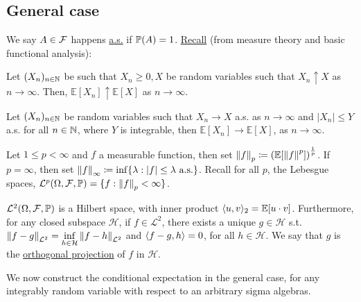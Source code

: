 \documentclass{article}
\begin{document}
\subsection{General case}

We say $ A\in \mathcal{F}$ happens \underline{a.s.} if $ \mathbb{P}(A) = 1$. \underline{Recall} (from measure theory and basic functional analysis): 
\begin{theorem}\label{thm: MCT}
	Let $(X_{n})_{n\in \mathbb{N}}$ be such that $ X_{n}\geq 0, X$ be random variables such that $ X_{n}\uparrow X$ as $ n\to \infty$. Then, $\mathbb{E}[X_{n}]\uparrow\mathbb{E}[X]$ as $ n\to \infty$.
\end{theorem}
 
\begin{theorem}\label{thm: DCT}
	Let $ (X_{n})_{n\in \mathbb{N}}$ be random variables such that $ X_{n}\to X$ a.s. as $ n\to \infty$ and $ |X_{n}|\leq Y$ a.s. for all $ n\in \mathbb{N}$, where $ Y$ is integrable, then $\mathbb{E}[X_{n}]\to\mathbb{E}[X]$, as $ n\to \infty$.
\end{theorem}

Let $ 1\leq p <\infty$ and $ f $ a measurable function, then set $ \left\lVert f\right\rVert_{p}\coloneqq \left(\mathbb{E}[\left\lVert f\right\rVert^{p}]\right)^{\frac{1}{p}}$. If $ p =\infty$, then set $ \left\lVert f\right\rVert_{\infty}\coloneqq \displaystyle \inf \{\lambda: |f|\leq \lambda \text{ a.s.}\}$. Recall for all $ p$, the Lebesgue spaces, $\mathcal{L}^{p}(\Omega, \mathcal{F}, \mathbb{P})=\{f: \left\lVert f\right\rVert_{p}<\infty\}$.

\begin{theorem}\label{thm: orthog proj hilbert}
	$ \mathcal{L}^{2}(\Omega, \mathcal{F}, \mathbb{P}) $ is a Hilbert space, with inner product $  \langle u, v\rangle_{2}=\mathbb{E}[u\cdot v]$. Furthermore, for any closed subspace $\mathcal{H}$, if $ f\in\mathcal{L}^{2}$, there exists a unique $ g\in\mathcal{H}$ s.t. $ \left\lVert f-g\right\rVert_{\mathcal{L}^{2}}=\displaystyle\inf_{h\in\mathcal{H}}\left\lVert f-h\right\rVert_{\mathcal{L}^{2}}$ and $ \langle f-g, h\rangle=0$, for all $ h\in\mathcal{H}$. We say that $ g$ is the \underline{orthogonal projection} of $ f$ in $\mathcal{H}$.
\end{theorem}


We now construct the conditional expectation in the general case, for any integrably random variable with respect to an arbitrary sigma algebras.
\end{document}
